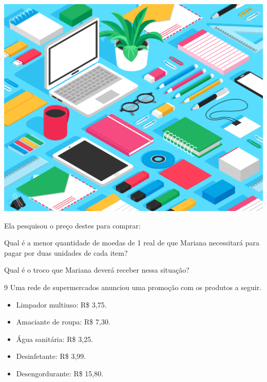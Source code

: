 \begin{center}
\includegraphics[width=\textwidth]{media/image37d.jpeg}
\end{center}

Ela pesquisou o preço destes para comprar:


\begin{escolha}
\item
  Qual é a menor quantidade de moedas de 1 real de que Mariana necessitará para
  pagar por duas unidades de cada item?

\item
  Qual é o troco que Mariana deverá receber nessa situação?
\end{escolha}

\num{9} Uma rede de supermercados anunciou uma promoção com os produtos a seguir.

\begin{mdframed}[linewidth=2pt,linecolor=azul!20,backgroundcolor=azul!20,roundcorner=2pt]
\begin{itemize}
  \item Limpador multiuso: R\$ 3,75.
  \item Amaciante de roupa: R\$ 7,30.
  \item Água sanitária: R\$ 3,25.
  \item Desinfetante: R\$ 3,99.
  \item Desengordurante: R\$ 15,80.
\end{itemize}
\end{mdframed}

